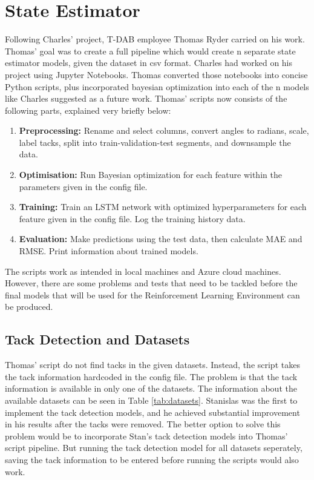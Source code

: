\section{State Estimator} \label{sec:state-estimator}

Following Charles' project, T-DAB employee Thomas Ryder carried on his work. Thomas' goal was to create a full pipeline which would create n separate state estimator models, given the dataset in csv format.  Charles had worked on his project using Jupyter Notebooks. Thomas converted those notebooks into concise Python scripts, plus incorporated bayesian optimization into each of the n models like Charles suggested as a future work. Thomas' scripts now consists of the following parts, explained very briefly below:

\begin{enumerate}
  \item \textbf{Preprocessing:} Rename and select columns, convert angles to radians, scale, label tacks, split into train-validation-test segments, and downsample the data.
  \item \textbf{Optimisation:} Run Bayesian optimization for each feature within the parameters given in the config file.
  \item \textbf{Training:} Train an LSTM network with optimized hyperparameters for each feature given in the config file. Log the training history data.
  \item \textbf{Evaluation:} Make predictions using the test data, then calculate MAE and RMSE. Print information about trained models.
\end{enumerate}

The scripts work as intended in local machines and Azure cloud machines. However, there are some problems and tests that need to be tackled before the final models that will be used for the Reinforcement Learning Environment can be produced. 

\subsection{Tack Detection and Datasets} \label{subsec:tack-detection-and-datasets}

Thomas' script do not find tacks in the given datasets. Instead, the script takes the tack information hardcoded in the config file. The problem is that the tack information is available in only one of the datasets. The information about the available datasets can be seen in Table \ref{tab:datasets}. Stanislas was the first to implement the tack detection models, and he achieved substantial improvement in his results after the tacks were removed. The better option to solve this problem would be to incorporate Stan's tack detection models into Thomas' script pipeline. But running the tack detection model for all datasets seperately, saving the tack information to be entered before running the scripts would also work.

